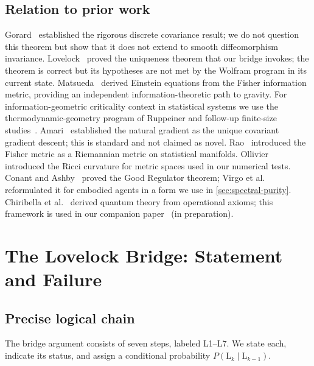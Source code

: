 \documentclass[11pt]{article}
\theoremstyle{definition}
\theoremstyle{remark}
\begin{document}
\subsection{Relation to prior work}
\label{sec:prior-work}

Gorard~\cite{Gorard2020} established the rigorous discrete covariance
result; we do not question this theorem but show that it does not extend
to smooth diffeomorphism invariance.
Lovelock~\cite{Lovelock1971} proved the uniqueness theorem that our
bridge invokes; the theorem is correct but its hypotheses are not met by
the Wolfram program in its current state.
Matsueda~\cite{Matsueda2013} derived Einstein equations from the Fisher
information metric, providing an independent information-theoretic path
to gravity.
For information-geometric criticality context in statistical systems we use
the thermodynamic-geometry program of Ruppeiner and follow-up finite-size
studies~\cite{Ruppeiner1979,Ruppeiner1995,Janke2004,BrodyRitz2003}.
Amari~\cite{Amari1998} established the natural gradient as the unique
covariant gradient descent; this is standard and not claimed as novel.
Rao~\cite{Rao1945} introduced the Fisher metric as a Riemannian metric
on statistical manifolds.
Ollivier~\cite{Ollivier2009} introduced the Ricci curvature for metric
spaces used in our numerical tests.
Conant and Ashby~\cite{ConantAshby1970} proved the Good Regulator
theorem; Virgo et al.~\cite{Virgo2025} reformulated it for embodied
agents in a form we use in \cref{sec:spectral-purity}.
Chiribella et al.~\cite{Chiribella2011} derived quantum theory from
operational axioms; this framework is used in our companion
paper~\cite{companion_qm} (in preparation).

\section{The Lovelock Bridge: Statement and Failure}
\label{sec:failure}

\subsection{Precise logical chain}
\label{sec:logical-chain}

The bridge argument consists of seven steps, labeled L1--L7.
We state each, indicate its status, and assign a conditional probability
$P(\text{L}_{k} \mid \text{L}_{k-1})$.
\end{document}
